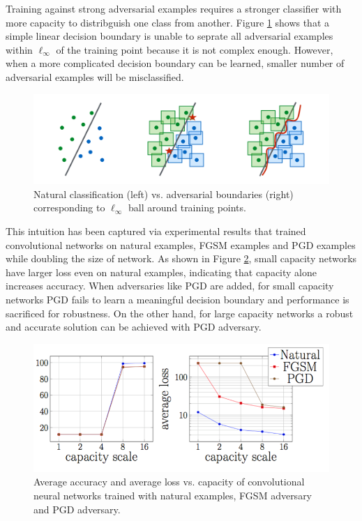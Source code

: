 \documentclass[10pt]{article}
\begin{document}
Training against strong adversarial examples requires a stronger classifier with more capacity to distribguish one class from another. Figure \ref{fig:boundary} shows that a simple linear decision boundary is unable to seprate all adversarial examples within $\ell_{\infty}$ of the training point because it is not complex enough. However, when a more complicated decision boundary can be learned, smaller number of adversarial examples will be misclassified. 
\begin{figure}[!h]
\centering
\includegraphics[width=0.9\linewidth]{boundary}
\caption{Natural classification (left) vs. adversarial boundaries (right) corresponding to $\ell_{\infty}$ ball around training points.}
\label{fig:boundary}
\end{figure}

This intuition has been captured via experimental results that trained convolutional
networks on natural examples, FGSM examples and PGD examples while doubling the size
of network. As shown in Figure \ref{fig:capacity}, small capacity networks have larger loss even on natural examples, indicating that capacity alone increases accuracy. When adversaries like PGD are added, for small capacity networks PGD fails to learn a meaningful decision boundary and performance is sacrificed for robustness. On the other hand, for large capacity networks a robust and accurate solution can be achieved with PGD adversary.

\begin{figure}[!h]
\centering
\includegraphics[width=0.6\linewidth]{capacity}
\caption{Average accuracy and average loss vs. capacity of convolutional neural networks trained with natural examples, FGSM adversary and PGD adversary.}
\label{fig:capacity}
\end{figure}
\end{document}
